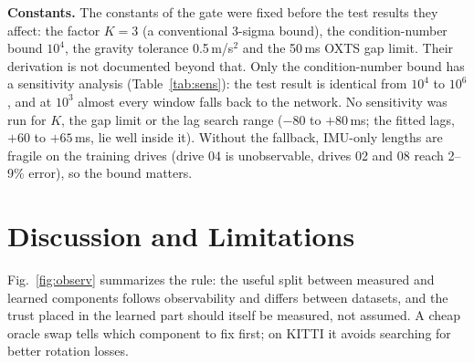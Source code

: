 \documentclass[letterpaper,journal]{IEEEtran}
\begin{document}
\begin{table}[t]
\caption{Sensitivity to the KITTI condition-number bound ($W=500$). Training: share of edges that use the IMU length and the median relative error of those lengths. Test: $t_\mathrm{rel}$\,\%, mean of three seeds (with 08; no 08 with mirror augmentation).}
\label{tab:sens}
\centering\small
\setlength{\tabcolsep}{3pt}
\end{table}

\textbf{Constants.} The constants of the gate were fixed before the test results they affect: the factor $K=3$ (a conventional 3-sigma bound), the condition-number bound $10^4$, the gravity tolerance 0.5\,m/s$^2$ and the 50\,ms OXTS gap limit. Their derivation is not documented beyond that. Only the condition-number bound has a sensitivity analysis (Table~\ref{tab:sens}): the test result is identical from $10^4$ to $10^6$, and at $10^3$ almost every window falls back to the network. No sensitivity was run for $K$, the gap limit or the lag search range ($-80$ to $+80$\,ms; the fitted lags, $+60$ to $+65$\,ms, lie well inside it). Without the fallback, IMU-only lengths are fragile on the training drives (drive 04 is unobservable, drives 02 and 08 reach 2--9\% error), so the bound matters.

\section{Discussion and Limitations}

Fig.~\ref{fig:observ} summarizes the rule: the useful split between measured and learned components follows observability and differs between datasets, and the trust placed in the learned part should itself be measured, not assumed. A cheap oracle swap tells which component to fix first; on KITTI it avoids searching for better rotation losses.
\end{document}
